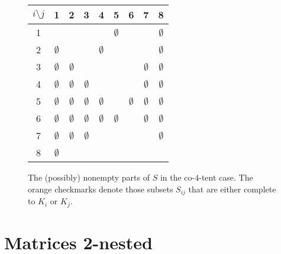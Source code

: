 \documentclass[12pt]{book}
\theoremstyle{plain}
\theoremstyle{remark}
\begin{document}
\begin{figure}[h!]	 
\begin{center}
	\begin{tabular}{ c | c c c c c c c c} 
		 \hline
		 $i\setminus j$ & 1 & 2 & 3 & 4 & 5 & 6 & 7 & 8 \\ 
		  \hline
		 1 & \checkmark & \checkmark & \textcolor{orange}{\checkmark} & \textcolor{orange}{\checkmark} & $\emptyset$ & \textcolor{orange}{\checkmark} & \checkmark & $\emptyset$ \\ 
		 2 & $\emptyset$ & \checkmark & \checkmark & $\emptyset$ & \textcolor{orange}{\checkmark} & \checkmark & \textcolor{orange}{\checkmark} & $\emptyset$ \\
 		 3 & $\emptyset$ & $\emptyset$ & \checkmark & \checkmark & \textcolor{orange}{\checkmark} & \checkmark & $\emptyset$ & $\emptyset$ \\
		 4 & $\emptyset$ & $\emptyset$ & $\emptyset$ & \checkmark & \checkmark & \textcolor{orange}{\checkmark} & $\emptyset$ & $\emptyset$ \\
		 5 & $\emptyset$ & $\emptyset$ & $\emptyset$ & $\emptyset$ & \checkmark & $\emptyset$ & $\emptyset$ & $\emptyset$ \\
		 6 & $\emptyset$  & $\emptyset$  & $\emptyset$  & $\emptyset$  & $\emptyset$ & \checkmark & $\emptyset$  &  $\emptyset$  \\
		7 & $\emptyset$ & $\emptyset$ & $\emptyset$ & \textcolor{orange}{\checkmark} & \checkmark & \checkmark & \checkmark & $\emptyset$ \\
		8 & $\emptyset$ & \textcolor{orange}{\checkmark} & \checkmark & \checkmark & \textcolor{orange}{\checkmark} & \checkmark & \checkmark & \checkmark \\
	\end{tabular}
\end{center} 
\caption{The (possibly) nonempty parts of $S$ in the co-$4$-tent case. The orange checkmarks denote those subsets $S_{ij}$ that are either complete to $K_i$ or $K_j$.} \label{fig:tabla_co4tent_1}
\end{figure}





%
\chapter*{Matrices 2-nested}
\end{document}
